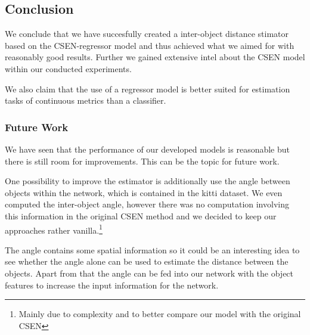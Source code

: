 \documentclass[a4paper, 11pt]{article}
\begin{document}
\begin{multicols}{2}
\section{Conclusion}
\begin{flushleft}
We conclude that we have succesfully created a inter-object distance stimator based on the CSEN-regressor model and thus achieved what we aimed for with reasonably good results. Further we gained extensive intel about the CSEN model within our conducted experiments.

We also claim that the use of a regressor model is better suited for estimation tasks of continuous metrics than a classifier.
\end{flushleft}

\subsubsection{Future Work}
\begin{flushleft}
We have seen that the performance of our developed models is reasonable but there is still room for improvements. This can be the topic for future work.

One possibility to improve the estimator is additionally use the angle between objects within the network, which is contained in the kitti dataset. We even computed the inter-object angle, however there was no computation involving this information in the original CSEN method and we decided to keep our approaches rather vanilla.\footnote{Mainly due to complexity and to better compare our model with the original CSEN}

The angle contains some spatial information so it could be an interesting idea to see whether the angle alone can be used to estimate the distance between the objects. Apart from that the angle can be fed into our network with the object features to increase the input information for the network.
\end{flushleft}

\end{multicols}
\newpage
\begingroup
\raggedright
\sloppy
\small
\nocite{*}
\leavevmode
\printbibliography
\endgroup
\end{document}
